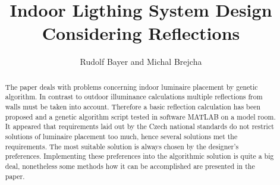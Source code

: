 \documentclass[Afour,sagev,times,doublespace]{sagej}
\begin{document}

\title{Indoor Ligthing System Design Considering Reflections}

\author{Rudolf Bayer and Michal Brejcha}




\begin{abstract}
The paper deals with problems concerning indoor luminaire placement by genetic algorithm. In contrast to outdoor illuminance calculations multiple reflections from walls must be taken into account. Therefore a basic reflection calculation has been proposed and a genetic algorithm script tested in software MATLAB on a model room. It appeared that requirements laid out by the Czech national standards do not restrict solutions of luminaire placement too much, hence several solutions met the requirements. The most suitable solution is always chosen by the designer's preferences. Implementing these preferences into the algorithmic solution is quite a big deal, nonetheless some methods how it can be accomplished are presented in the paper.
\end{abstract}


\maketitle









\end{document}
